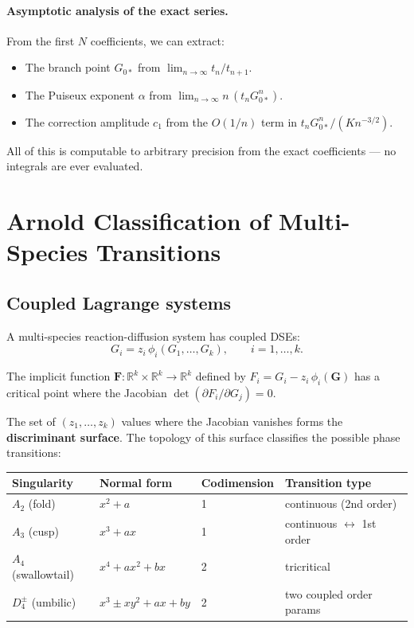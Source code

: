 \documentclass[11pt,a4paper]{article}
\theoremstyle{definition}
\begin{document}
\paragraph{Asymptotic analysis of the exact series.}
From the first $N$ coefficients, we can extract:
\begin{itemize}[leftmargin=2em]
\item The branch point $G_{0*}$ from $\lim_{n \to \infty} t_n/t_{n+1}$.
\item The Puiseux exponent $\alpha$ from $\lim_{n \to \infty} n\,(t_n G_{0*}^n)$.
\item The correction amplitude $c_1$ from the $O(1/n)$ term in $t_n G_{0*}^n / (K n^{-3/2})$.
\end{itemize}

All of this is computable to arbitrary precision from the exact
coefficients --- no integrals are ever evaluated.


\section{Arnold Classification of Multi-Species Transitions}
\label{sec:arnold}

\subsection{Coupled Lagrange systems}

A multi-species reaction-diffusion system has coupled DSEs:
\begin{equation}
G_i = z_i\,\phi_i(G_1, \ldots, G_k), \qquad i = 1, \ldots, k.
\label{eq:coupled_lagrange}
\end{equation}

The implicit function $\mathbf{F}: \mathbb{R}^k \times \mathbb{R}^k \to \mathbb{R}^k$
defined by $F_i = G_i - z_i\,\phi_i(\mathbf{G})$ has a critical point
where the Jacobian $\det(\partial F_i / \partial G_j) = 0$.

The set of $(z_1, \ldots, z_k)$ values where the Jacobian vanishes forms
the \textbf{discriminant surface}. The topology of this surface classifies
the possible phase transitions:

\begin{center}
\renewcommand{\arraystretch}{1.3}
\begin{tabular}{llll}
\toprule
Singularity & Normal form & Codimension & Transition type \\
\midrule
$A_2$ (fold) & $x^2 + a$ & 1 & continuous (2nd order) \\
$A_3$ (cusp) & $x^3 + ax$ & 1 & continuous $\leftrightarrow$ 1st order \\
$A_4$ (swallowtail) & $x^4 + ax^2 + bx$ & 2 & tricritical \\
$D_4^{\pm}$ (umbilic) & $x^3 \pm xy^2 + ax + by$ & 2 & two coupled order params \\
\bottomrule
\end{tabular}
\end{center}
\end{document}
